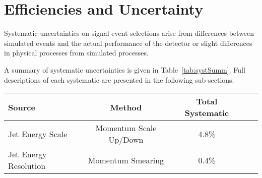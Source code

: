 \chapter{Efficiencies and Uncertainty}
\label{ch:eff_and_unc}

Systematic uncertainties on signal event selections arise from differences between simulated events and the actual performance of  the detector or slight differences in physical processes from simulated processes.

A summary of systematic uncertainties is given in Table~\ref{tab:systSumm}. Full descriptions of each systematic are presented in the following sub-sections.

\begin{table}[h]
\begin{center}

\begin{tabular}{lcccc}\hline
Source 					& Method & Total Systematic 	\\ \hline
Jet Energy Scale			& Momentum Scale Up/Down                        & 4.8\%	\\
Jet Energy Resolution	                   	& Momentum Smearing                                         & 0.4\%	\\


\end{tabular}
\end{center}
\end{table}
